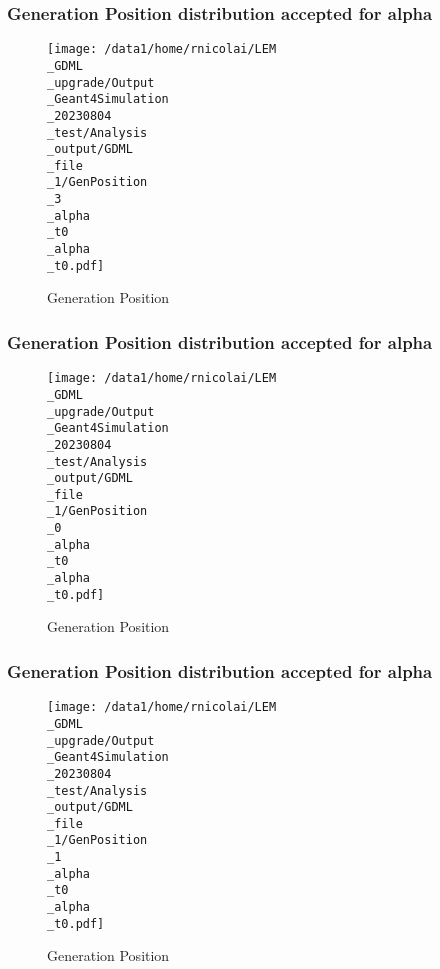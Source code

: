 \documentclass[8pt]{beamer}
\begin{document}
            \begin{frame}
                \frametitle{Generation Position distribution accepted for alpha}
            
        \begin{figure}[h]
            \centering
            \texttt{[image: /data1/home/rnicolai/LEM\\\_GDML\\\_upgrade/Output\\\_Geant4Simulation\\\_20230804\\\_test/Analysis\\\_output/GDML\\\_file\\\_1/GenPosition\\\_3\\\_alpha\\\_t0\\\_alpha\\\_t0.pdf]}
            \caption{Generation Position}
        \end{figure}
        
            \end{frame}
            
            \begin{frame}
                \frametitle{Generation Position distribution accepted for alpha}
            
        \begin{figure}[h]
            \centering
            \texttt{[image: /data1/home/rnicolai/LEM\\\_GDML\\\_upgrade/Output\\\_Geant4Simulation\\\_20230804\\\_test/Analysis\\\_output/GDML\\\_file\\\_1/GenPosition\\\_0\\\_alpha\\\_t0\\\_alpha\\\_t0.pdf]}
            \caption{Generation Position}
        \end{figure}
        
            \end{frame}
            
            \begin{frame}
                \frametitle{Generation Position distribution accepted for alpha}
            
        \begin{figure}[h]
            \centering
            \texttt{[image: /data1/home/rnicolai/LEM\\\_GDML\\\_upgrade/Output\\\_Geant4Simulation\\\_20230804\\\_test/Analysis\\\_output/GDML\\\_file\\\_1/GenPosition\\\_1\\\_alpha\\\_t0\\\_alpha\\\_t0.pdf]}
            \caption{Generation Position}
        \end{figure}
        
            \end{frame}
            
        
\end{document}
